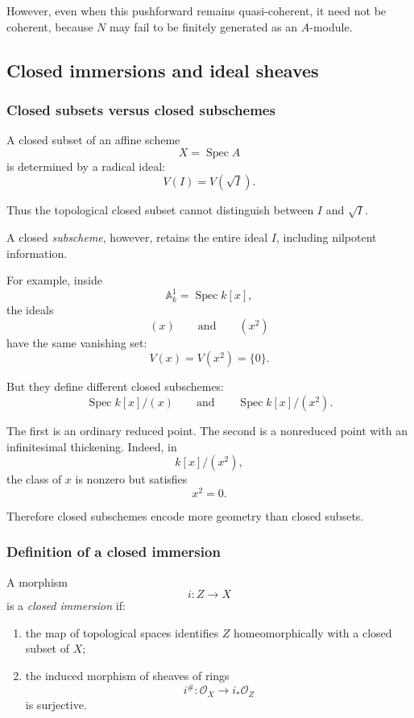 \documentclass[12pt,a4paper]{article}
\DeclareMathOperator{\Spec}{Spec}
\newcommand{\OO}{\mathcal{O}}
\providecommand{\Spec}{\operatorname{Spec}}
\providecommand{\A}{\mathbb A}
\theoremstyle{notespace}
\begin{document}
However, even when this pushforward remains quasi-coherent, it need not be coherent, because \(N\) may fail to be finitely generated as an \(A\)-module.

\subsection{Closed immersions and ideal sheaves}

\subsubsection{Closed subsets versus closed subschemes}

A closed subset of an affine scheme
\[
X=\Spec A
\]
is determined by a radical ideal:
\[
V(I)=V(\sqrt{I}).
\]

Thus the topological closed subset cannot distinguish between \(I\) and \(\sqrt I\).

A closed \emph{subscheme}, however, retains the entire ideal \(I\), including nilpotent information.

For example, inside
\[
\A^1_k=\Spec k[x],
\]
the ideals
\[
(x)
\qquad\text{and}\qquad
(x^2)
\]
have the same vanishing set:
\[
V(x)=V(x^2)=\{0\}.
\]

But they define different closed subschemes:
\[
\Spec k[x]/(x)
\qquad\text{and}\qquad
\Spec k[x]/(x^2).
\]

The first is an ordinary reduced point. The second is a nonreduced point with an infinitesimal thickening. Indeed, in
\[
k[x]/(x^2),
\]
the class of \(x\) is nonzero but satisfies
\[
x^2=0.
\]

Therefore closed subschemes encode more geometry than closed subsets.

\subsubsection{Definition of a closed immersion}

A morphism
\[
i:Z\longrightarrow X
\]
is a \emph{closed immersion} if:

\begin{enumerate}[label=\arabic*.]
	\item the map of topological spaces identifies \(Z\) homeomorphically with a closed subset of \(X\);
	\item the induced morphism of sheaves of rings
	\[
	i^\#:\OO_X\longrightarrow i_*\OO_Z
	\]
	is surjective.
\end{enumerate}
\end{document}

